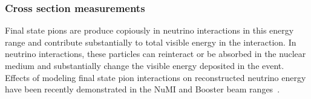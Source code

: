 % 
%


\subsubsection{Cross section measurements}


Final state pions are produce copiously in neutrino interactions in this energy range 
and contribute substantially to total visible energy in the interaction.
In neutrino interactions, these particles can reinteract or be absorbed in the nuclear medium
and substantially change the visible energy deposited in the event. 
Effects of modeling final state pion interactions on reconstructed neutrino energy have 
been recently demonstrated in the NuMI and Booster beam ranges~\cite{miniboonefsi, minervafsi}. 

